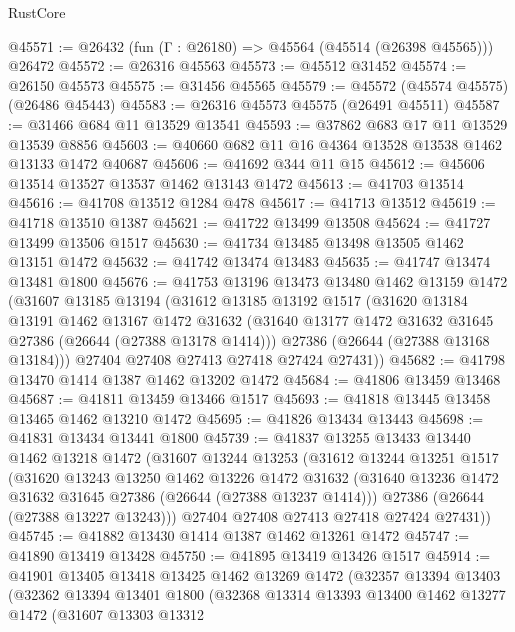 \begin{lexlean}{RustCore}
\begin{coremodule}
@45571 := @26432 (fun (Γ : @26180) => @45564 (@45514 (@26398 @45565))) @26472
@45572 := @26316 @45563
@45573 := @45512 @31452
@45574 := @26150 @45573
@45575 := @31456 @45565
@45579 := @45572 (@45574 @45575) (@26486 @45443)
@45583 := @26316 @45573 @45575 (@26491 @45511)
@45587 := @31466 @684 @11 @13529 @13541
@45593 := @37862 @683 @17 @11 @13529 @13539 @8856
@45603 := @40660 @682 @11 @16 @4364 @13528 @13538 @1462 @13133 @1472 @40687
@45606 := @41692 @344 @11 @15
@45612 := @45606 @13514 @13527 @13537 @1462 @13143 @1472
@45613 := @41703 @13514
@45616 := @41708 @13512 @1284 @478
@45617 := @41713 @13512
@45619 := @41718 @13510 @1387
@45621 := @41722 @13499 @13508
@45624 := @41727 @13499 @13506 @1517
@45630 := @41734 @13485 @13498 @13505 @1462 @13151 @1472
@45632 := @41742 @13474 @13483
@45635 := @41747 @13474 @13481 @1800
@45676 := @41753
    @13196
    @13473
    @13480
    @1462
    @13159
    @1472
    (@31607
      @13185
      @13194
      (@31612
        @13185
        @13192
        @1517
        (@31620
          @13184
          @13191
          @1462
          @13167
          @1472
          @31632
          (@31640 @13177 @1472 @31632 @31645 @27386 (@26644 (@27388 @13178 @1414)))
          @27386
          (@26644 (@27388 @13168 @13184)))
        @27404
        @27408
        @27413
        @27418
        @27424
        @27431))
@45682 := @41798 @13470 @1414 @1387 @1462 @13202 @1472
@45684 := @41806 @13459 @13468
@45687 := @41811 @13459 @13466 @1517
@45693 := @41818 @13445 @13458 @13465 @1462 @13210 @1472
@45695 := @41826 @13434 @13443
@45698 := @41831 @13434 @13441 @1800
@45739 := @41837
    @13255
    @13433
    @13440
    @1462
    @13218
    @1472
    (@31607
      @13244
      @13253
      (@31612
        @13244
        @13251
        @1517
        (@31620
          @13243
          @13250
          @1462
          @13226
          @1472
          @31632
          (@31640 @13236 @1472 @31632 @31645 @27386 (@26644 (@27388 @13237 @1414)))
          @27386
          (@26644 (@27388 @13227 @13243)))
        @27404
        @27408
        @27413
        @27418
        @27424
        @27431))
@45745 := @41882 @13430 @1414 @1387 @1462 @13261 @1472
@45747 := @41890 @13419 @13428
@45750 := @41895 @13419 @13426 @1517
@45914 := @41901
    @13405
    @13418
    @13425
    @1462
    @13269
    @1472
    (@32357
      @13394
      @13403
      (@32362
        @13394
        @13401
        @1800
        (@32368
          @13314
          @13393
          @13400
          @1462
          @13277
          @1472
          (@31607
            @13303
            @13312

\end{coremodule}
\end{lexlean}
